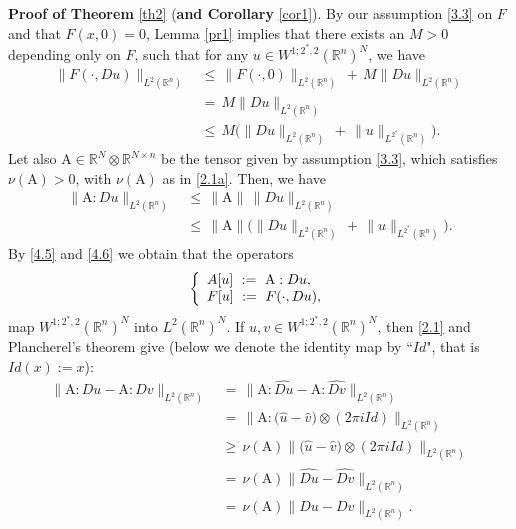 \documentclass{amsart}
\theoremstyle{definition}
\numberwithin{equation}{section}
\begin{document}
{\medskip \noindent \textbf{Proof of Theorem} } \ref{th2} (\textbf{and Corollary} \ref{cor1}). By our assumption \eqref{3.3} on $F$ and that $F(x,0)=0$, Lemma \ref{pr1} implies that there exists an $M>0$ depending only on $F$, such that for any $u\in W^{1;2^*\!,2}({\mathbb{R}}^n)^N$, we have
\begin{align} \label{4.5}
\big\|F(\cdot,Du) \big\|_{L^2({\mathbb{R}}^n)} \, &\leq\, \big\| F(\cdot,0)\big\|_{L^2({\mathbb{R}}^n)}\, +\, M \| Du\|_{L^2({\mathbb{R}}^n)} \\
&=\, M \| Du\|_{L^2({\mathbb{R}}^n)} \nonumber\\
&\leq\, M \Big( \| Du\|_{L^2({\mathbb{R}}^n)} \, +\, \| u\|_{L^{2^*}({\mathbb{R}}^n)} \Big). \nonumber
\end{align}
Let also ${\textrm{A}} \in {\mathbb{R}}^N {\otimes} {\mathbb{R}}^{N{\times} n}$ be the tensor given by assumption \eqref{3.3}, which satisfies $\nu({\textrm{A}})>0$, with $\nu({\textrm{A}})$ as in \eqref{2.1a}. Then, we have
\begin{align} \label{4.6}
\|{\textrm{A}}:Du\|_{L^2({\mathbb{R}}^n)}\, &\leq\, \|{\textrm{A}}\|\, \| Du\|_{L^2({\mathbb{R}}^n)} \nonumber\\
&\leq\,  \|{\textrm{A}}\| \Big( \| Du\|_{L^2({\mathbb{R}}^n)} \, +\, \| u\|_{L^{2^*}({\mathbb{R}}^n)} \Big).\nonumber
\end{align}
By \eqref{4.5} and \eqref{4.6} we obtain that the operators 
\[
\left\{
\begin{array}{l}
A[u]\ :=\ {\textrm{A}} :Du, {\medskip}\\
F[u]\ :=\ F(\cdot, Du),
\end{array}
\right.
\]
map $W^{1;2^*\!,2}({\mathbb{R}}^n)^N$ into  $L^2({\mathbb{R}}^n)^N$. If $u,v\in W^{1;2^*\!,2}({\mathbb{R}}^n)^N$, then \eqref{2.1} and Plancherel's theorem give (below we denote the identity map by ``$Id$", that is $Id(x):=x$):
\begin{align} \label{4.6}
\big\|{\textrm{A}}:Du -{\textrm{A}}:Dv \big\|_{L^2({\mathbb{R}}^n)}\, &= \, \big\|{\textrm{A}}:\widehat{Du} - {\textrm{A}}:\widehat{Dv} \big\|_{L^2({\mathbb{R}}^n)} \nonumber\\
&= \, \big\| {\textrm{A}}: \big(\widehat{u}-\widehat{v}\big) {\otimes} (2\pi i Id) \big\|_{L^2({\mathbb{R}}^n)}   \nonumber \\
&\geq \, \nu({\textrm{A}})\big\| \big(\widehat{u}-\widehat{v}\big) {\otimes} (2\pi i Id) \big\|_{L^2({\mathbb{R}}^n)} \\
&= \, \nu({\textrm{A}})\big\|\widehat{Du} - \widehat{Dv} \big\|_{L^2({\mathbb{R}}^n)}  \nonumber\\
&= \, \nu({\textrm{A}})\big\| {Du} -  {Dv} \big\|_{L^2({\mathbb{R}}^n)}.   \nonumber
\end{align}
\end{document}
